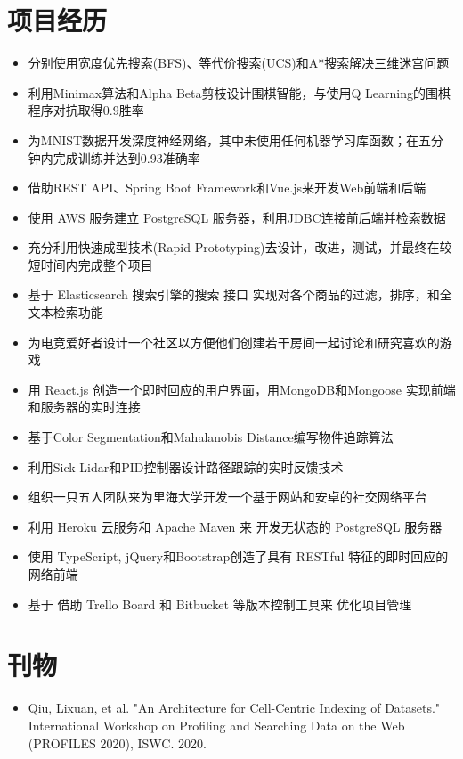 \documentclass{resume}
\begin{document}
\section{项目经历}
\begin{itemize}
  \item 分别使用宽度优先搜索(BFS)、等代价搜索(UCS)和A*搜索解决三维迷宫问题
  \item 利用Minimax算法和Alpha Beta剪枝设计围棋智能，与使用Q Learning的围棋程序对抗取得0.9胜率
  \item 为MNIST数据开发深度神经网络，其中未使用任何机器学习库函数；在五分钟内完成训练并达到0.93准确率
\end{itemize}
\vspace{-10pt}
\begin{itemize}
  \item 借助REST API、Spring Boot Framework和Vue.js来开发Web前端和后端
  \item 使用 AWS 服务建立 PostgreSQL 服务器，利用JDBC连接前后端并检索数据
  \item 充分利用快速成型技术(Rapid Prototyping)去设计，改进，测试，并最终在较短时间内完成整个项目
  \item 基于 Elasticsearch 搜索引擎的搜索 接口 实现对各个商品的过滤，排序，和全文本检索功能
\end{itemize}
\vspace{-8pt}
\begin{itemize}
  \item 为电竞爱好者设计一个社区以方便他们创建若干房间一起讨论和研究喜欢的游戏
  \item 用 React.js 创造一个即时回应的用户界面，用MongoDB和Mongoose 实现前端和服务器的实时连接
\end{itemize}
\vspace{-8pt}
\begin{itemize}
  \item 基于Color Segmentation和Mahalanobis Distance编写物件追踪算法
  \item 利用Sick Lidar和PID控制器设计路径跟踪的实时反馈技术
\end{itemize}
\vspace{-8pt}
\begin{itemize}
  \item 组织一只五人团队来为里海大学开发一个基于网站和安卓的社交网络平台
  \item 利用 Heroku 云服务和 Apache Maven 来 开发无状态的 PostgreSQL 服务器
  \item 使用 TypeScript, jQuery和Bootstrap创造了具有 RESTful 特征的即时回应的网络前端
  \item 基于 借助 Trello Board 和 Bitbucket 等版本控制工具来 优化项目管理
\end{itemize}

\section{刊物}
\begin{itemize}[parsep=0.2ex]
  \item Qiu, Lixuan, et al. "An Architecture for Cell-Centric Indexing of Datasets." International Workshop on Profiling and Searching Data on the Web (PROFILES 2020), ISWC. 2020.
\end{itemize}
\end{document}
